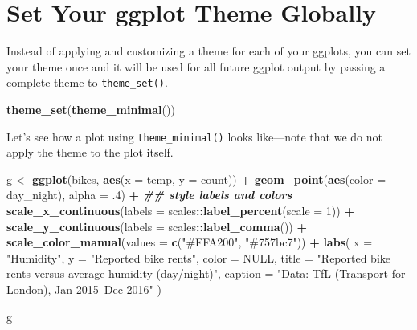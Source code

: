 \documentclass[
]{krantz}
\makeatletter
\newenvironment{Shaded}{\begin{snugshade}}{\end{snugshade}}
\newcommand{\AttributeTok}[1]{\textcolor[rgb]{0.27,0.27,0.27}{#1}}
\newcommand{\ConstantTok}[1]{\textcolor[rgb]{0.37,0.37,0.37}{#1}}
\newcommand{\DecValTok}[1]{\textcolor[rgb]{0.06,0.06,0.06}{#1}}
\newcommand{\DocumentationTok}[1]{\textcolor[rgb]{0.37,0.37,0.37}{\textbf{\textit{#1}}}}
\newcommand{\FunctionTok}[1]{\textcolor[rgb]{0.27,0.27,0.27}{\textbf{#1}}}
\newcommand{\NormalTok}[1]{#1}
\newcommand{\OtherTok}[1]{\textcolor[rgb]{0.37,0.37,0.37}{#1}}
\newcommand{\SpecialCharTok}[1]{\textcolor[rgb]{0.43,0.43,0.43}{\textbf{#1}}}
\newcommand{\StringTok}[1]{\textcolor[rgb]{0.5,0.5,0.5}{#1}}
\newenvironment{kframe}{%
\medskip{}
\setlength{\fboxsep}{.8em}
 \def\at@end@of@kframe{}%
 \ifinner\ifhmode%
  \def\at@end@of@kframe{\end{minipage}}%
  \begin{minipage}{\columnwidth}%
 \fi\fi%
 \def\FrameCommand##1{\hskip\@totalleftmargin \hskip-\fboxsep
 \colorbox{shadecolor}{##1}\hskip-\fboxsep
     \hskip-\linewidth \hskip-\@totalleftmargin \hskip\columnwidth}%
 \MakeFramed {\advance\hsize-\width
   \@totalleftmargin\z@ \linewidth\hsize
   \@setminipage}}%
 {\par\unskip\endMakeFramed%
 \at@end@of@kframe}
\renewenvironment{Shaded}{\begin{kframe}}{\end{kframe}}
\makeatother
\begin{document}
\hypertarget{set-your-ggplot-theme-globally}{%
\section{Set Your ggplot Theme Globally}\label{set-your-ggplot-theme-globally}}

Instead of applying and customizing a theme for each of your ggplots, you can set your theme once and it will be used for all future ggplot output by passing a complete theme to \texttt{theme\_set()}.

\begin{Shaded}
\begin{Highlighting}[]
\FunctionTok{theme\_set}\NormalTok{(}\FunctionTok{theme\_minimal}\NormalTok{())}
\end{Highlighting}
\end{Shaded}

Let's see how a plot using \texttt{theme\_minimal()} looks like---note that we do not apply the theme to the plot itself.

\begin{Shaded}
\begin{Highlighting}[]
\NormalTok{g }\OtherTok{\textless{}{-}} 
  \FunctionTok{ggplot}\NormalTok{(bikes, }\FunctionTok{aes}\NormalTok{(}\AttributeTok{x =}\NormalTok{ temp, }\AttributeTok{y =}\NormalTok{ count)) }\SpecialCharTok{+}
  \FunctionTok{geom\_point}\NormalTok{(}\FunctionTok{aes}\NormalTok{(}\AttributeTok{color =}\NormalTok{ day\_night), }\AttributeTok{alpha =}\NormalTok{ .}\DecValTok{4}\NormalTok{) }\SpecialCharTok{+}
  \DocumentationTok{\#\# style labels and colors}
  \FunctionTok{scale\_x\_continuous}\NormalTok{(}\AttributeTok{labels =}\NormalTok{ scales}\SpecialCharTok{::}\FunctionTok{label\_percent}\NormalTok{(}\AttributeTok{scale =} \DecValTok{1}\NormalTok{)) }\SpecialCharTok{+}
  \FunctionTok{scale\_y\_continuous}\NormalTok{(}\AttributeTok{labels =}\NormalTok{ scales}\SpecialCharTok{::}\FunctionTok{label\_comma}\NormalTok{()) }\SpecialCharTok{+}
  \FunctionTok{scale\_color\_manual}\NormalTok{(}\AttributeTok{values =} \FunctionTok{c}\NormalTok{(}\StringTok{"\#FFA200"}\NormalTok{, }\StringTok{"\#757bc7"}\NormalTok{)) }\SpecialCharTok{+}
  \FunctionTok{labs}\NormalTok{(}
    \AttributeTok{x =} \StringTok{"Humidity"}\NormalTok{, }\AttributeTok{y =} \StringTok{"Reported bike rents"}\NormalTok{, }\AttributeTok{color =} \ConstantTok{NULL}\NormalTok{,}
    \AttributeTok{title =} \StringTok{"Reported bike rents versus average humidity (day/night)"}\NormalTok{,}
    \AttributeTok{caption =} \StringTok{"Data: TfL (Transport for London), Jan 2015–Dec 2016"}
\NormalTok{  )}
  
\NormalTok{g}
\end{Highlighting}
\end{Shaded}
\end{document}
